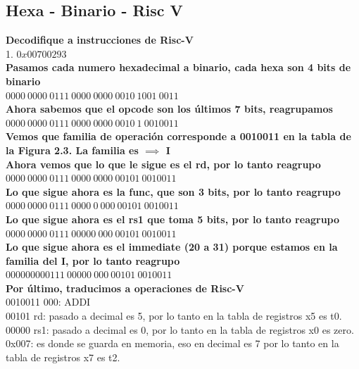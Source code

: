\documentclass[10pt,a4paper]{article}
\begin{document}
\subsection*{Hexa - Binario - Risc V}
\textbf{Decodifique a instrucciones de Risc-V} \\
1. $0x00700293$ \\ 

\textbf{Pasamos cada numero hexadecimal a binario, cada hexa son 4 bits de binario} \\ 
$0000 \ 0000 \ 0111 \ 0000 \ 0000 \ 0010 \ 1001 \ 0011$ \\

\textbf{Ahora sabemos que el opcode son los últimos 7 bits, reagrupamos} \\ 
$0000 \ 0000 \ 0111 \ 0000 \ 0000 \ 0010 \ 1 \ 0010011$ \\

\textbf{Vemos que familia de operación corresponde a 0010011 en la tabla de la Figura 2.3. La familia es $ \implies $ I} \\
\textbf{Ahora vemos que lo que le sigue es el rd, por lo tanto reagrupo} \\
$0000 \ 0000 \ 0111 \ 0000 \ 0000 \ 00101 \ 0010011$ \\

\textbf{Lo que sigue ahora es la func, que son 3 bits, por lo tanto reagrupo} \\
$0000 \ 0000 \ 0111 \ 0000 \ 0 \ 000 \ 00101 \ 0010011$ \\

\textbf{Lo que sigue ahora es el rs1 que toma 5 bits, por lo tanto reagrupo} \\ 
$0000 \ 0000 \ 0111 \ 00000 \ 000 \ 00101 \ 0010011$ \\ 

\textbf{Lo que sigue ahora es el immediate (20 a 31) porque estamos en la familia del I, por lo tanto reagrupo} \\ 
$0000 0000 0111 \ 00000 \ 000 \ 00101 \ 0010011$ \\

\textbf{Por último, traducimos a operaciones de Risc-V} \\ 
0010011 000: ADDI  \\ 
00101 rd: pasado a decimal es 5, por lo tanto en la tabla de registros x5 es t0. \\
00000 rs1: pasado a decimal es 0, por lo tanto en la tabla de registros x0 es zero. \\
0x007: es donde se guarda en memoria, eso en decimal es 7 por lo tanto en la tabla de registros x7 es t2. \\ 
\end{document}
